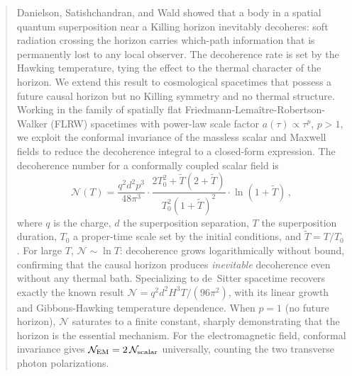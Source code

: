 
\begin{abstract}
Danielson, Satishchandran, and Wald showed that a body in a spatial quantum
superposition near a Killing horizon inevitably decoheres: soft radiation
crossing the horizon carries which-path information that is permanently lost
to any local observer.  The decoherence rate is set by the Hawking temperature,
tying the effect to the thermal character of the horizon.  We extend this
result to cosmological spacetimes that possess a future causal horizon but no
Killing symmetry and no thermal structure.  Working in the family of spatially
flat Friedmann-Lema\^{i}tre-Robertson-Walker (FLRW) spacetimes with power-law
scale factor $a(\tau) \propto \tau^{p}$, $p > 1$, we exploit the conformal
invariance of the massless scalar and Maxwell fields to reduce the decoherence
integral to a closed-form expression.  The decoherence number for a conformally
coupled scalar field is
\[
  \mathcal{N}(T)
  =
  \frac{q^{2}d^{2}p^{3}}{48\pi^{3}}
  \cdot
  \frac{2T_{0}^{2} + \widetilde{T}(2 + \widetilde{T})}
       {T_{0}^{2}(1 + \widetilde{T})^{2}}
  \cdot
  \ln(1 + \widetilde{T}) \,,
\]
where $q$ is the charge, $d$ the superposition separation, $T$ the
superposition duration, $T_{0}$ a proper-time scale set by the initial
conditions, and $\widetilde{T} = T/T_{0}$.  For large $T$,
$\mathcal{N} \sim \ln T$: decoherence grows logarithmically without bound,
confirming that the causal horizon produces \emph{inevitable} decoherence
even without any thermal bath.  Specializing to de~Sitter spacetime recovers
exactly the known result $\mathcal{N} = q^{2}d^{2}H^{3}T/(96\pi^{2})$,
with its linear growth and Gibbons-Hawking temperature dependence.  When
$p = 1$ (no future horizon), $\mathcal{N}$ saturates to a finite constant,
sharply demonstrating that the horizon is the essential mechanism.  For the
electromagnetic field, conformal invariance gives
$\mathcal{N}_{\rm EM} = 2\,\mathcal{N}_{\rm scalar}$ universally, counting
the two transverse photon polarizations.
\end{abstract}
